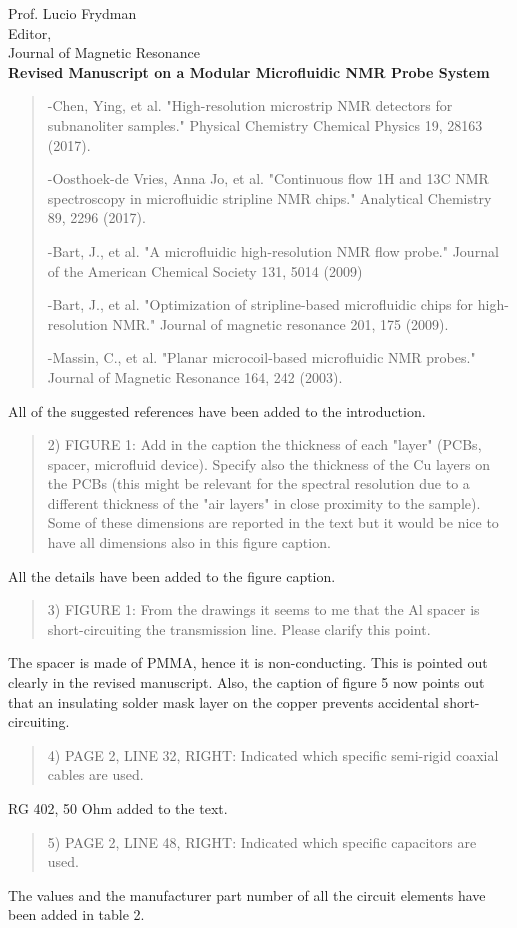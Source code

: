 \documentclass{mu-soton-letter}
\newenvironment{reviewer} {\begin{quote}\color{black!50}} {\end{quote}}
\begin{document}
\begin{letter}{Prof. Lucio Frydman\\
  Editor,\\
  Journal of Magnetic Resonance\\[2cm]
  \textbf{Revised Manuscript on a Modular Microfluidic NMR Probe System}}
\begin{reviewer}

-Chen, Ying, et al. "High-resolution microstrip NMR detectors for subnanoliter samples." Physical Chemistry Chemical Physics 19, 28163 (2017).


-Oosthoek-de Vries, Anna Jo, et al. "Continuous flow 1H and 13C NMR spectroscopy in microfluidic stripline NMR chips." Analytical Chemistry 89,  2296 (2017).


-Bart, J., et al. "A microfluidic high-resolution NMR flow probe." Journal of the American Chemical Society 131, 5014 (2009)


-Bart, J., et al. "Optimization of stripline-based microfluidic chips for high-resolution NMR." Journal of magnetic resonance 201, 175 (2009).


-Massin, C., et al. "Planar microcoil-based microfluidic NMR probes." Journal of Magnetic Resonance 164, 242 (2003).

\end{reviewer}
All of the suggested references have been added to the introduction.

\begin{reviewer}
2) FIGURE 1: Add in the caption the thickness of each "layer" (PCBs, spacer, microfluid device). Specify also the thickness of the Cu layers on the PCBs (this might be relevant for the spectral resolution due to a different thickness of the "air layers" in close proximity to the sample). Some of these dimensions are reported in the text but it would be nice to have all dimensions also in this figure caption.
\end{reviewer}
All the details have been added to the figure caption.

\begin{reviewer}
3) FIGURE 1: From the drawings it seems to me that the Al spacer is short-circuiting the transmission line. Please clarify this point.
\end{reviewer}
The spacer is made of PMMA, hence it is non-conducting. This is pointed out
clearly in the revised manuscript. Also, the caption of figure 5 now points out
that an insulating solder mask layer on the copper prevents accidental short-circuiting.
\begin{reviewer}
4) PAGE 2, LINE 32, RIGHT: Indicated which specific semi-rigid coaxial cables are used.
\end{reviewer}
RG 402, 50 Ohm added to the text.
\begin{reviewer}
5) PAGE 2, LINE 48, RIGHT: Indicated which specific capacitors are used.
\end{reviewer}
The values and the manufacturer part number of all the circuit elements
have been added in table 2.


\end{letter}
\end{document}
